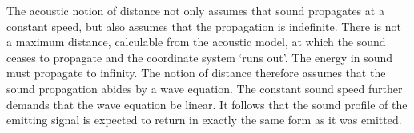 The acoustic notion of distance not only assumes
that sound propagates at a constant speed,
but also assumes that the propagation is indefinite.
There is not a maximum distance,
calculable from the acoustic model,
at which the sound ceases to propagate and the coordinate system `runs out'.
The energy in sound must propagate to infinity.
The notion of distance therefore assumes that the sound propagation abides by a wave equation.
The constant sound speed further demands that the wave equation be linear.
%
It follows that the sound profile of the emitting signal is expected %
to return in exactly the same form as it was emitted.





